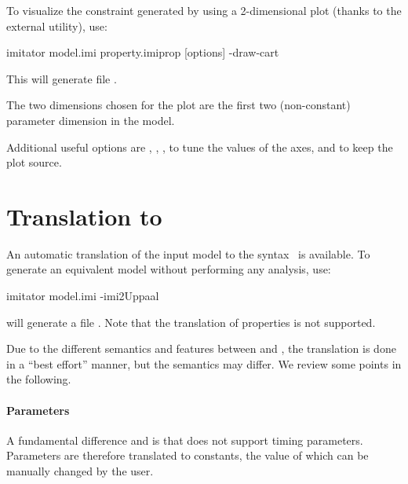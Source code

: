 To visualize the constraint generated by \imitator{} using a 2-dimensional plot (thanks to the external  utility), use:

\begin{terminal}
imitator model.imi property.imiprop [options] -draw-cart
\end{terminal}

This will generate file .

The two dimensions chosen for the plot are the first two (non-constant) parameter dimension in the model.

Additional useful options are
,
,
,
to tune the values of the axes,
and  to keep the plot source.


\section{Translation to \uppaal{}}\label{section:uppaal}

An automatic translation of the input model to the \uppaal{} syntax~\cite{LPY97} is available.
To generate an equivalent \uppaal{} model without performing any analysis, use:

\begin{terminal}
imitator model.imi -imi2Uppaal
\end{terminal}

\imitator{} will generate a file .
Note that the translation of properties is not supported.

Due to the different semantics and features between \imitator{} and \uppaal{}, the translation is done in a ``best effort'' manner, but the semantics may differ.
We review some points in the following.

\paragraph{Parameters}
A fundamental difference \imitator{} and \uppaal{} is that \uppaal{} does not support timing parameters.
Parameters are therefore translated to constants, the value of which can be manually changed by the user.

